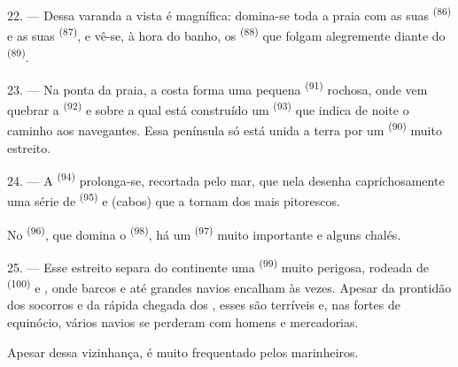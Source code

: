 22. --- Dessa varanda a vista é magnífica: domina-se toda a praia com as
suas  \textsuperscript{(86)} e as suas 
\textsuperscript{(87)}, e vê-se, à hora do banho, os 
\textsuperscript{(88)} que folgam alegremente diante do 
\textsuperscript{(89)}.

23. --- Na ponta da praia, a costa forma uma pequena 
\textsuperscript{(91)} rochosa, onde vem quebrar a 
\textsuperscript{(92)} e sobre a qual está construído um 
\textsuperscript{(93)} que indica de noite o caminho aos navegantes. Essa
península só está unida a terra por um  \textsuperscript{(90)} muito
estreito.

\VUsaut{3.0mm}
\VUsaut{3.0mm}

24. --- A  \textsuperscript{(94)} prolonga-se, recortada pelo mar,
que nela desenha caprichosamente uma série de 
\textsuperscript{(95)} e  (cabos) que a tornam dos mais
pitorescos.

No  \textsuperscript{(96)}, que domina o 
\textsuperscript{(98)}, há um  \textsuperscript{(97)} muito importante e
alguns chalés.

25. --- Esse estreito separa do continente uma 
\textsuperscript{(99)} muito perigosa, rodeada de 
\textsuperscript{(100)} e , onde barcos e até grandes navios
encalham às vezes. Apesar da prontidão dos socorros e da rápida chegada
dos , esses  são terríveis e,
nas fortes  de equinócio, vários navios se perderam
com homens e mercadorias.

Apesar dessa vizinhança,  é muito frequentado pelos
marinheiros.
\VUsaut{6.0mm}
\VUfilet{22mm}
